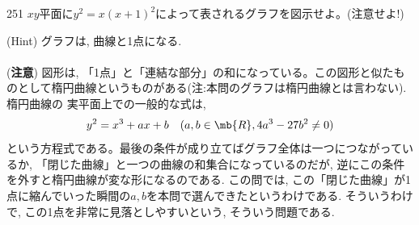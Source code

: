\begin{prob}{251}{}{}
 $xy$平面に$y^2=x(x+1)^2$によって表されるグラフを図示せよ。(注意せよ!)\\
\end{prob}
(Hint) グラフは, 曲線と1点になる. \\
\\
(\textbf{注意}) 図形は, 「1点」と「連結な部分」の和になっている。この図形と似たものとして楕円曲線というものがある(注:本問のグラフは楕円曲線とは言わない). 楕円曲線の 実平面上での一般的な式は, 
\[y^2 = x^3+ ax + b\quad (a,b\in \mb{R}, 4a^3 - 27b^2 \neq 0)\]
という方程式である。最後の条件が成り立てばグラフ全体は一つにつながっているか, 「閉じた曲線」と一つの曲線の和集合になっているのだが, 逆にこの条件を外すと楕円曲線が変な形になるのである. この問では, この「閉じた曲線」が1点に縮んでいった瞬間の$a,b$を本問で選んできたというわけである. そういうわけで, この1点を非常に見落としやすいという, そういう問題である.